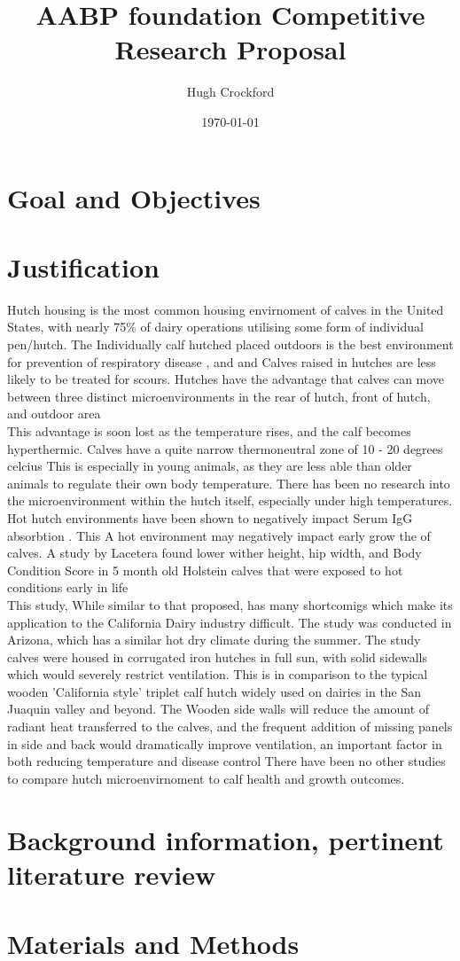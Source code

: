\documentclass[12pt]{article}
\title{AABP foundation Competitive Research Proposal}
\author{Hugh Crockford}
\date{\today}
\begin{document}
	\begin{abstract}
	
	\end{abstract}
	\section{Goal and Objectives}
	\section{Justification}
	Hutch housing is the most common housing envirnoment of calves in the United States, with nearly 75\% of dairy operations utilising some form of individual pen/hutch.\cite{NAHMS2007}
	The Individually calf hutched placed outdoors is the best environment for prevention of respiratory disease \cite{callan2002biosecurity}, and and Calves raised in hutches are less likely to be treated for scours. \cite{Waltner-Toews1986}
	Hutches have the advantage that calves can move between three distinct microenvironments in the rear of hutch, front of hutch, and outdoor area ~\cite{brunsvold1985} \\
	This advantage is soon lost as the temperature rises, and the calf becomes hyperthermic. Calves have a quite narrow thermoneutral zone of 10 - 20 degrees celcius \cite{Gebremedhin1981}
	This is especially in young animals, as they are less able than older animals to regulate their own body temperature.\cite{Christopherson1976}
	There has been no research into the microenvironment within the hutch itself, especially under high temperatures.
	Hot hutch environments have been shown to negatively impact Serum IgG absorbtion \cite{Stott1976} . This 
	A hot environment may negatively impact early grow the of calves. 
	A study by Lacetera found lower wither height, hip width, and Body Condition Score in 5 month old Holstein calves that were exposed to hot conditions early in life \cite{lacetera1994} \\
	This study, While similar to that proposed, has many shortcomigs which make its application to the California Dairy industry difficult. 
	The study was conducted in Arizona, which has a similar hot dry climate during the summer.
	The study calves were housed in corrugated iron hutches in full sun, with solid sidewalls which would severely restrict ventilation. This is in comparison to the typical wooden 'California style' triplet calf hutch widely used on dairies in the San Juaquin valley and beyond. The Wooden side walls will reduce the amount of radiant heat transferred to the calves, and the frequent addition of missing panels in side and back would dramatically improve ventilation, an important factor in both reducing temperature and disease control %
	There have been no other studies to compare hutch microenvirnoment to calf health and growth outcomes.

	\section{Background information, pertinent literature review}
	\section{Materials and Methods}
	
	
\end{document}
